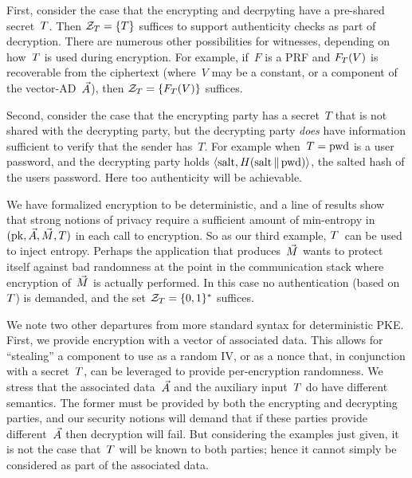 First, consider the case that the encrypting and decrpyting have a pre-shared secret~$T$.  Then $\mathcal{Z}_T=\{T\}$ suffices to support authenticity checks as part of decryption.  There are numerous other possibilities for witnesses, depending on how~$T$ is used during encryption.  For example, if~$F$ is a PRF and $F_T(V)$ is recoverable from the ciphertext (where~$V$ may be a constant, or a component of the vector-AD~$\vec{A}$), then $\mathcal{Z}_T=\{F_T(V)\}$ suffices.  

Second, consider the case that the encrypting party has a secret~$T$ that is not shared with the decrypting party, but the decrypting party \emph{does} have information sufficient to verify that the sender has~$T$.  For example when~$T=\mathrm{pwd}$ is a user password, and the decrypting party holds $\langle \mathrm{salt},H(\mathrm{salt} \,\|\, \mathrm{pwd})\rangle$, the salted hash of the users password.  Here too authenticity will be achievable.

We have formalized encryption to be deterministic, and a line of results \cite{xxx,yyy,zzz} show that strong notions of privacy require a sufficient amount of min-entropy in $(\mathrm{pk},\vec{A},\vec{M},T)$ in each call to encryption.  
So as our third example, $T$~can be used to inject entropy.  
Perhaps the application that produces~$\vec{M}$ wants to protect itself against bad randomness at the point in the communication stack where encryption of~$\vec{M}$ is actually performed.  In this case no authentication (based on~$T$) is demanded, and the set $\mathcal{Z}_T=\{0,1\}^*$ suffices.

We note two other departures from more standard syntax for deterministic PKE.  First, we provide encryption with a vector of associated data.  This allows for ``stealing'' a component to use as a random IV, or as a nonce that, in conjunction with a secret~$T$, can be leveraged to provide per-encryption randomness.  We stress that the associated data~$\vec{A}$ and the auxiliary input~$T$ do have different semantics.  The former must be provided by both the encrypting and decrypting parties, and our security notions will demand that if these parties provide different~$\vec{A}$ then decryption will fail.  But considering the examples just given, it is not the case that~$T$ will be known to both parties; hence it cannot simply be considered as part of the associated data.

